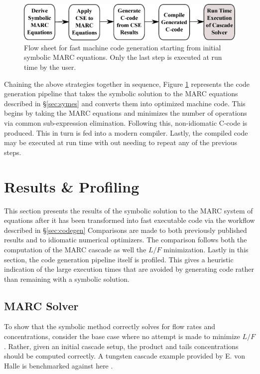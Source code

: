 \documentclass[preprint,12pt]{elsarticle}
\begin{document}
\begin{figure}
\begin{center}
\includegraphics[scale=0.45]{codegen_pipeline.eps}
\caption{Flow sheet for fast machine code generation starting from initial symbolic MARC
equations.  Only the last step is executed at run time by the user.}
\label{codegen_pipeline}
\end{center}
\end{figure}

Chaining the above strategies together in sequence, Figure \ref{codegen_pipeline} 
represents the 
code generation pipeline that takes the symbolic solution to the MARC equations
described in \S\ref{sec:symes} and converts them into optimized machine code.
This begins by taking the MARC equations and minimizes the number of operations
via common sub-expression elimination.  Following this, non-idiomatic
C-code is produced.  This in turn is fed into a modern compiler.  Lastly, the compiled
code may be executed at run time with out needing to repeat any of the previous steps.

\section{Results \& Profiling}
\label{sec:res}

This section presents the results of the symbolic solution to the MARC system 
of equations after it has been transformed into fast executable code via the 
workflow described in \S\ref{sec:codegen}  Comparisons are made to both previously
published results and to idiomatic numerical optimizers.  The 
comparison follows both the computation of the MARC cascade as well the $L/F$ 
minimization. Lastly in this section, the code generation pipeline itself is profiled. 
 This gives a
heuristic indication of the large execution times that are avoided by generating 
code rather than remaining with a symbolic solution.

\subsection{MARC Solver}
\label{sec:l-solver}

To show that the symbolic method correctly solves for flow rates and concentrations,
consider the base case where no attempt is made to minimize $L/F$.  Rather, given 
an initial cascade setup, the product and tails concentrations should be computed 
correctly.  A tungsten cascade example provided by E. von Halle is benchmarked against
here \cite{VonHalle1987}.
\end{document}

